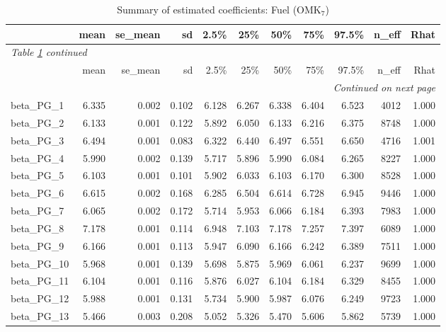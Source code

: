 \documentclass[12pt]{article}
\begin{document}
\begingroup
\footnotesize
\setlength{\tabcolsep}{3pt}
\begin{longtable}{lrrrrrrrrrr}
\caption{Summary of estimated coefficients: Fuel (OMK$_\text{7}$)}
\label{tab:coef_summary_omk7} \\
\toprule
 & mean & se\_mean & sd & 2.5\% & 25\% & 50\% & 75\% & 97.5\% & n\_eff & Rhat \\
\midrule
\endfirsthead
\multicolumn{11}{l}{\textit{Table \ref{tab:coef_summary_omk7} continued}} \\
\toprule
 & mean & se\_mean & sd & 2.5\% & 25\% & 50\% & 75\% & 97.5\% & n\_eff & Rhat \\
\midrule
\endhead
\midrule
\multicolumn{11}{r}{\textit{Continued on next page}} \\
\endfoot
\bottomrule
\endlastfoot
beta\_PG\_1   &  6.335 & 0.002 & 0.102 &  6.128 &  6.267 &  6.338 &  6.404 &  6.523 &  4012 & 1.000 \\
beta\_PG\_2   &  6.133 & 0.001 & 0.122 &  5.892 &  6.050 &  6.133 &  6.216 &  6.375 &  8748 & 1.000 \\
beta\_PG\_3   &  6.494 & 0.001 & 0.083 &  6.322 &  6.440 &  6.497 &  6.551 &  6.650 &  4716 & 1.001 \\
beta\_PG\_4   &  5.990 & 0.002 & 0.139 &  5.717 &  5.896 &  5.990 &  6.084 &  6.265 &  8227 & 1.000 \\
beta\_PG\_5   &  6.103 & 0.001 & 0.101 &  5.902 &  6.033 &  6.103 &  6.170 &  6.300 &  8528 & 1.000 \\
beta\_PG\_6   &  6.615 & 0.002 & 0.168 &  6.285 &  6.504 &  6.614 &  6.728 &  6.945 &  9446 & 1.000 \\
beta\_PG\_7   &  6.065 & 0.002 & 0.172 &  5.714 &  5.953 &  6.066 &  6.184 &  6.393 &  7983 & 1.000 \\
beta\_PG\_8   &  7.178 & 0.001 & 0.114 &  6.948 &  7.103 &  7.178 &  7.257 &  7.397 &  6089 & 1.000 \\
beta\_PG\_9   &  6.166 & 0.001 & 0.113 &  5.947 &  6.090 &  6.166 &  6.242 &  6.389 &  7511 & 1.000 \\
beta\_PG\_10  &  5.968 & 0.001 & 0.139 &  5.698 &  5.875 &  5.969 &  6.061 &  6.237 &  9699 & 1.000 \\
beta\_PG\_11  &  6.104 & 0.001 & 0.116 &  5.876 &  6.027 &  6.104 &  6.184 &  6.329 &  8455 & 1.000 \\
beta\_PG\_12  &  5.988 & 0.001 & 0.131 &  5.734 &  5.900 &  5.987 &  6.076 &  6.249 &  9723 & 1.000 \\
beta\_PG\_13  &  5.466 & 0.003 & 0.208 &  5.052 &  5.326 &  5.470 &  5.606 &  5.862 &  5739 & 1.000 \\

\end{longtable}
\end{document}
